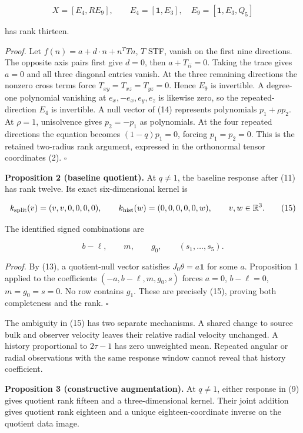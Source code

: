 \documentclass[aps,prd,preprint,onecolumn,notitlepage]{revtex4-2}
\begin{document}
\[
X=[E_4,RE_9],\qquad E_4=[\mathbf1,E_3],\quad
E_9=[\mathbf1,E_3,Q_5]                                  \tag{14}
\]

has rank thirteen.

\emph{Proof.} Let \(f(n)=a+d\cdot n+n^TTn\), \(T\) STF, vanish on the first nine directions. The opposite axis pairs first give \(d=0\), then \(a+T_{ii}=0\). Taking the trace gives \(a=0\) and all three diagonal entries vanish. At the three remaining directions the nonzero cross terms force \(T_{xy}=T_{xz}=T_{yz}=0\). Hence \(E_9\) is invertible. A degree-one polynomial vanishing at \(e_x,-e_x,e_y,e_z\) is likewise zero, so the repeated-direction \(E_4\) is invertible. A null vector of (14) represents polynomials \(p_1+\rho p_2\). At \(\rho=1\), unisolvence gives \(p_2=-p_1\) as polynomials. At the four repeated directions the equation becomes \((1-q)p_1=0\), forcing \(p_1=p_2=0\). This is the retained two-radius rank argument, expressed in the orthonormal tensor coordinates (2). \(\square\)

\textbf{Proposition 2 (baseline quotient).} At \(q\ne1\), the baseline response after (11) has rank twelve. Its exact six-dimensional kernel is

\[
k_{\rm split}(v)=(v,v,0,0,0,0),\qquad
k_{\rm hist}(w)=(0,0,0,0,0,w),\qquad v,w\in\mathbb R^3.    \tag{15}
\]

The identified signed combinations are

\[
b-\ell,\qquad m,\qquad g_0,\qquad(s_1,\ldots,s_5).       \tag{16}
\]

\emph{Proof.} By (13), a quotient-null vector satisfies \(J_0\theta=a\mathbf1\) for some \(a\). Proposition 1 applied to the coefficients \((-a,b-\ell,m,g_0,s)\) forces \(a=0\), \(b-\ell=0\), \(m=g_0=s=0\). No row contains \(g_1\). These are precisely (15), proving both completeness and the rank. \(\square\)

The ambiguity in (15) has two separate mechanisms. A shared change to source bulk and observer velocity leaves their relative radial velocity unchanged. A history proportional to \(2\tau-1\) has zero unweighted mean. Repeated angular or radial observations with the same response window cannot reveal that history coefficient.

\textbf{Proposition 3 (constructive augmentation).} At \(q\ne1\), either response in (9) gives quotient rank fifteen and a three-dimensional kernel. Their joint addition gives quotient rank eighteen and a unique eighteen-coordinate inverse on the quotient data image.
\end{document}
